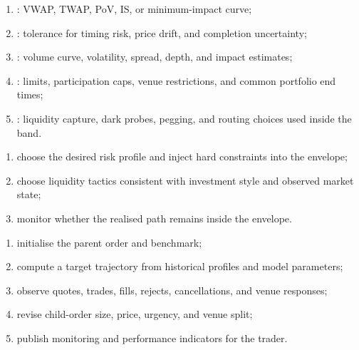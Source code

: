 \begin{taxonomy} 
\begin{enumerate}[label=\roman*.]
\setlength{\itemsep}{0pt}
\item {}: VWAP, TWAP, PoV, IS, or minimum-impact curve;
\item {}: tolerance for timing risk, price drift, and completion uncertainty;
\item {}: volume curve, volatility, spread, depth, and impact estimates;
\item {}: limits, participation caps, venue restrictions, and common portfolio end times;
\item {}: liquidity capture, dark probes, pegging, and routing choices used inside the band.
\end{enumerate}
\end{taxonomy}

\begin{process} 
\begin{enumerate}[label=\roman*.]
\setlength{\itemsep}{0pt}
\item choose the desired risk profile and inject hard constraints into the envelope;
\item choose liquidity tactics consistent with investment style and observed market state;
\item monitor whether the realised path remains inside the envelope.
\end{enumerate}
\end{process}

\begin{process} 
\begin{enumerate}[label=\roman*.]
\setlength{\itemsep}{0pt}
\item initialise the parent order and benchmark;
\item compute a target trajectory from historical profiles and model parameters;
\item observe quotes, trades, fills, rejects, cancellations, and venue responses;
\item revise child-order size, price, urgency, and venue split;
\item publish monitoring and performance indicators for the trader.
\end{enumerate}
\end{process}

